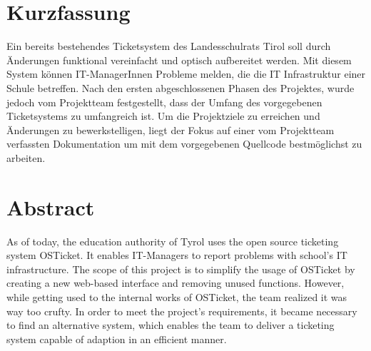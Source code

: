 \chapter*{Kurzfassung}
Ein bereits bestehendes Ticketsystem des Landesschulrats Tirol soll durch Änderungen funktional vereinfacht und optisch aufbereitet werden. Mit diesem System können IT-ManagerInnen Probleme melden, die die IT Infrastruktur einer Schule betreffen. Nach den ersten abgeschlossenen Phasen des Projektes, wurde jedoch vom Projektteam festgestellt, dass der Umfang des vorgegebenen Ticketsystems zu umfangreich ist.\newline
Um die Projektziele zu erreichen und Änderungen zu bewerkstelligen, liegt der Fokus auf einer vom Projektteam verfassten Dokumentation um mit dem vorgegebenen Quellcode bestmöglichst zu arbeiten.

\chapter*{Abstract}
As of today, the education authority of Tyrol uses the open source ticketing system OSTicket. It enables IT-Managers to report problems with school’s IT infrastructure. The scope of this project is to simplify the usage of OSTicket by creating a new web-based interface and removing unused functions. However, while getting used to the internal works of OSTicket, the team realized it was way too crufty.\newline
In order to meet the project’s requirements, it became necessary to find an alternative system, which enables the team to deliver a ticketing system capable of adaption in an efficient manner.


